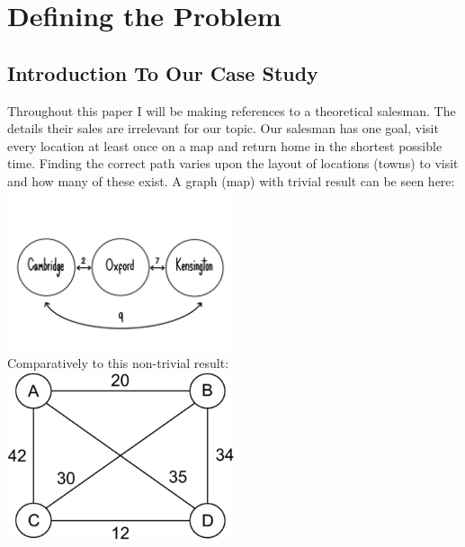 \documentclass[12pt]{report}
\begin{document}
\chapter{Defining the Problem}
\section{Introduction To Our Case Study}
Throughout this paper I will be making references to a theoretical salesman.
The details their sales are irrelevant for our topic.
Our salesman has one goal, visit every location at least once on a map and return home in the shortest possible time.
Finding the correct path varies upon the layout of locations (towns) to visit and how many of these exist.
A graph (map) with trivial result can be seen here:\\
\includegraphics[width=0.5\textwidth]{trivialTSP.png}\\
\vspace{0.5cm}
Comparatively to this non-trivial result:\\
\includegraphics[width=0.5\textwidth]{HarderTSP.png}
\end{document}
